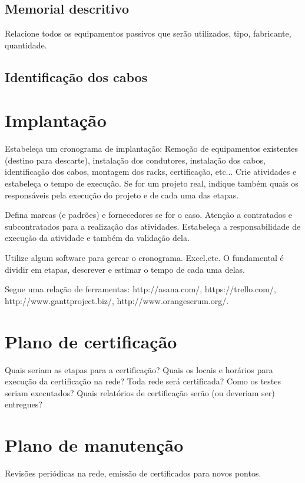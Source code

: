 \documentclass[	DIV=calc,%
							paper=a4,%
							fontsize=12pt,%
							onecolumn]{scrartcl}	 					%
\begin{document}
\subsection{Memorial descritivo}

Relacione todos os equipamentos passivos que serão utilizados, tipo, fabricante, quantidade.

\subsection{Identificação dos cabos}

\section{Implantação}
Estabeleça um cronograma de implantação:
Remoção de equipamentos existentes (destino para descarte), instalação dos condutores, instalação dos cabos, 
identificação dos cabos, montagem dos racks, certificação, etc... Crie atividades e estabeleça o tempo de execução. Se for um projeto real, indique também quais os responsáveis pela execução do projeto e de cada uma das etapas.

Defina marcas (e padrões) e fornecedores se for o caso. Atenção a contratados e subcontratados para a realização das atividades. Estabeleça a responsabilidade de execução da atividade e também da validação dela.

Utilize algum software para gerear o cronograma. Excel,etc. O fundamental é dividir em etapas, descrever e estimar o tempo de cada uma delas.

Segue uma relação de ferramentas:
http://asana.com/, 
https://trello.com/, 
http://www.ganttproject.biz/, 
http://www.orangescrum.org/. 

\section{Plano de certificação}
Quais seriam as etapas para a certificação? 
Quais os locais e horários para execução da certificação na rede? Toda rede será certificada?
Como os testes seriam executados?
Quais relatórios de certificação serão (ou deveriam ser) entregues? 

\section{Plano de manutenção}

Revisões periódicas na rede, emissão de certificados para novos pontos.
\end{document}
